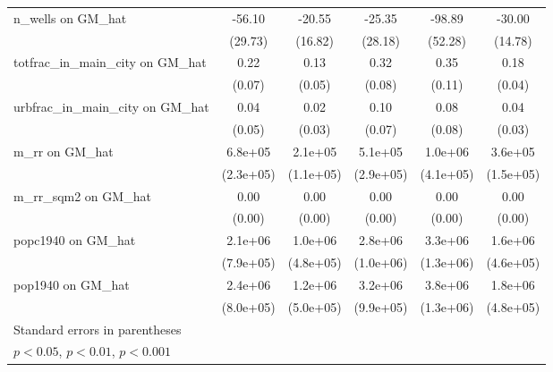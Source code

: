 {\begin{tabular}{l*{5}{c}}
\addlinespace
n\_wells on GM\_hat&   -56.10         &   -20.55         &   -25.35         &   -98.89         &   -30.00\sym{*}  \\
                &  (29.73)         &  (16.82)         &  (28.18)         &  (52.28)         &  (14.78)         \\
\addlinespace
totfrac\_in\_main\_city on GM\_hat&     0.22\sym{**} &     0.13\sym{**} &     0.32\sym{***}&     0.35\sym{**} &     0.18\sym{***}\\
                &   (0.07)         &   (0.05)         &   (0.08)         &   (0.11)         &   (0.04)         \\
\addlinespace
urbfrac\_in\_main\_city on GM\_hat&     0.04         &     0.02         &     0.10         &     0.08         &     0.04         \\
                &   (0.05)         &   (0.03)         &   (0.07)         &   (0.08)         &   (0.03)         \\
\addlinespace
m\_rr on GM\_hat  &  6.8e+05\sym{**} &  2.1e+05         &  5.1e+05         &  1.0e+06\sym{*}  &  3.6e+05\sym{*}  \\
                &(2.3e+05)         &(1.1e+05)         &(2.9e+05)         &(4.1e+05)         &(1.5e+05)         \\
\addlinespace
m\_rr\_sqm2 on GM\_hat&     0.00         &     0.00\sym{*}  &     0.00\sym{**} &     0.00         &     0.00\sym{**} \\
                &   (0.00)         &   (0.00)         &   (0.00)         &   (0.00)         &   (0.00)         \\
\addlinespace
popc1940 on GM\_hat&  2.1e+06\sym{**} &  1.0e+06\sym{*}  &  2.8e+06\sym{**} &  3.3e+06\sym{*}  &  1.6e+06\sym{***}\\
                &(7.9e+05)         &(4.8e+05)         &(1.0e+06)         &(1.3e+06)         &(4.6e+05)         \\
\addlinespace
pop1940 on GM\_hat&  2.4e+06\sym{**} &  1.2e+06\sym{*}  &  3.2e+06\sym{**} &  3.8e+06\sym{**} &  1.8e+06\sym{***}\\
                &(8.0e+05)         &(5.0e+05)         &(9.9e+05)         &(1.3e+06)         &(4.8e+05)         \\
\bottomrule
\multicolumn{6}{l}{\footnotesize Standard errors in parentheses}\\
\multicolumn{6}{l}{\footnotesize \sym{*} \(p<0.05\), \sym{**} \(p<0.01\), \sym{***} \(p<0.001\)}\\
\end{tabular}
}
